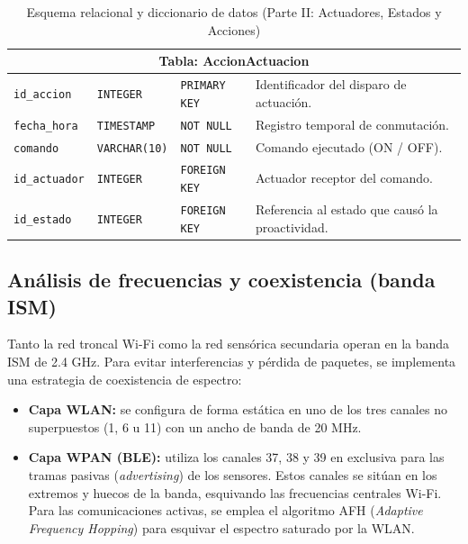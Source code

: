 \begin{table}[H]
{\begin{tabular}{|l|l|l|l|}
        \multicolumn{4}{|c|}{\textbf{Tabla: AccionActuacion}} \\ \hline
        \texttt{id\_accion} & \texttt{INTEGER} & \texttt{PRIMARY KEY} & \parbox[c]{5.6cm}{\vspace{0.15cm}Identificador del disparo de actuación.\vspace{0.15cm}} \\ \hline
        \texttt{fecha\_hora} & \texttt{TIMESTAMP} & \texttt{NOT NULL} & \parbox[c]{5.6cm}{\vspace{0.15cm}Registro temporal de conmutación.\vspace{0.15cm}} \\ \hline
        \texttt{comando} & \texttt{VARCHAR(10)} & \texttt{NOT NULL} & \parbox[c]{5.6cm}{\vspace{0.15cm}Comando ejecutado (ON / OFF).\vspace{0.15cm}} \\ \hline
        \texttt{id\_actuador} & \texttt{INTEGER} & \texttt{FOREIGN KEY} & \parbox[c]{5.6cm}{\vspace{0.15cm}Actuador receptor del comando.\vspace{0.15cm}} \\ \hline
        \texttt{id\_estado} & \texttt{INTEGER} & \texttt{FOREIGN KEY} & \parbox[c]{5.6cm}{\vspace{0.15cm}Referencia al estado que causó la proactividad.\vspace{0.15cm}} \\ \hline
    \end{tabular}
    }
    \caption{Esquema relacional y diccionario de datos (Parte II: Actuadores, Estados y Acciones)}
    \label{tab:esquema_relacional_2}

\end{table}

\subsection{Análisis de frecuencias y coexistencia (banda ISM)}
Tanto la red troncal Wi-Fi como la red sensórica secundaria operan en la banda ISM de 2.4 GHz. Para evitar interferencias y pérdida de paquetes, se implementa una estrategia de coexistencia de espectro:
\begin{itemize}
    \item \textbf{Capa WLAN:} se configura de forma estática en uno de los tres canales no superpuestos (1, 6 u 11) con un ancho de banda de 20 MHz.
    \item \textbf{Capa WPAN (BLE):} utiliza los canales 37, 38 y 39 en exclusiva para las tramas pasivas (\textit{advertising}) de los sensores. Estos canales se sitúan en los extremos y huecos de la banda, esquivando las frecuencias centrales Wi-Fi. Para las comunicaciones activas, se emplea el algoritmo AFH (\textit{Adaptive Frequency Hopping}) para esquivar el espectro saturado por la WLAN.
\end{itemize}

